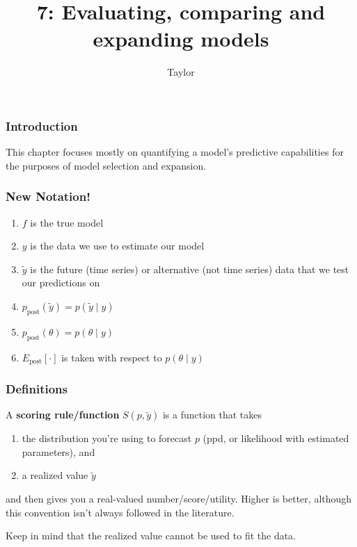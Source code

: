\documentclass{beamer}
\title["7"]{7: Evaluating, comparing and expanding models}
\author{Taylor}
\institute[UVA] 
{
University of Virginia \\
\medskip
\textit{} 
}
\date{}
\begin{document}

\begin{frame}
\titlepage 
\end{frame}

\begin{frame}
\frametitle{Introduction}

This chapter focuses mostly on quantifying a model's predictive capabilities for the purposes of model selection and expansion. 

\end{frame}

\begin{frame}
\frametitle{New Notation!}

\begin{enumerate}
\item $f$ is the true model 
\item $y$ is the data we use to estimate our model
\item $\tilde{y}$ is the future (time series) or alternative (not time series) data that we test our predictions on
\item $p_{\text{post}}(\tilde{y}) = p(\tilde{y} \mid y )$
\item $p_{\text{post}}(\theta) = p(\theta \mid y)$
\item $E_{\text{post}}[ \cdot ] $ is taken with respect to $p(\theta \mid y)$
\end{enumerate}


\end{frame}


\begin{frame}
\frametitle{Definitions}

A {\bf scoring rule/function} $S(p,\tilde{y})$ is a function that takes
\begin{enumerate}
\item the distribution you're using to forecast $p$ (ppd, or likelihood with estimated parameters), and 
\item a realized value $\tilde{y}$
\end{enumerate}
and then gives you a real-valued number/score/utility. Higher is better, although this convention isn't always followed in the literature.
\newline

Keep in mind that the realized value cannot be used to fit the data.
\end{frame}
\end{document}
